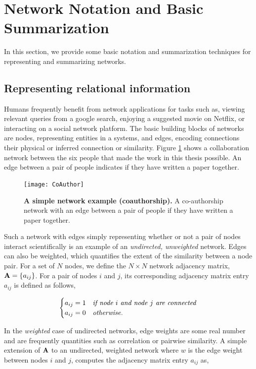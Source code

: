 \section{Network Notation and Basic Summarization}
In this section, we provide some basic notation and summarization techniques for representing and summarizing networks. 

\subsection{Representing relational information}

Humans frequently benefit from network applications for tasks such as, viewing relevant queries from a google search, enjoying a suggested movie on Netflix, or interacting on a social network platform. The basic building blocks of networks are nodes, representing entities in a systems, and edges, encoding connections their physical or inferred connection or similarity. Figure \ref{fig:social} shows a collaboration network between the six people that made the work in this thesis possible. An edge between a pair of people indicates if they have written a paper together. 
\begin{figure}[h!]
\begin{center}
\texttt{[image: CoAuthor]}
\caption{{\bf A simple network example (coauthorship).} A co-authorship network with an edge between a pair of people if they have written a paper together.}
\label{fig:social}
\end{center}
\end{figure}

Such a network with edges simply representing whether or not a pair of nodes interact scientifically is an example of an \emph{undirected, unweighted} network. Edges can also be weighted, which quantifies the extent of the similarity between a node pair. For a set of $N$ nodes, we define the $N \times N$ network adjacency matrix, ${\bf A}=\{a_{ij}\}$. For a pair of nodes $i$ and $j$, its corresponding adjacency matrix entry $a_{ij}$ is defined as follows,

\[ \begin{cases} 
     a_{ij}=1 & \text{\emph{if node $i$ and node $j$ are connected}} \\
      a_{ij}=0 & \text{\emph{otherwise}}.
         \end{cases}
\]

In the \emph{weighted} case of undirected networks, edge weights are some real number and are frequently quantities such as correlation or pairwise similarity. A simple extension of ${\bf A}$ to an undirected, weighted network where $w$ is the edge weight between nodes $i$ and $j$, computes the adjacency matrix entry $a_{ij}$ as, 

